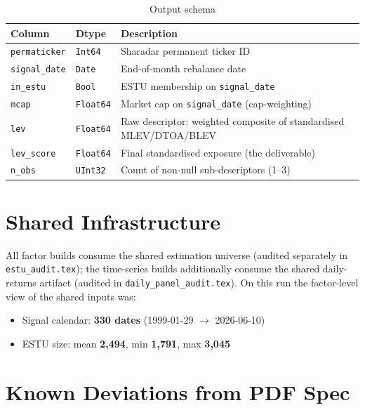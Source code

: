 \documentclass[11pt,a4paper]{article}
\begin{document}
\begin{table}[h!]
\centering
\caption{Output schema}
\begin{tabular}{llp{7.4cm}}
\toprule
\textbf{Column} & \textbf{Dtype} & \textbf{Description} \\
\midrule
\texttt{permaticker} & \texttt{Int64} & Sharadar permanent ticker ID \\
\texttt{signal\_date} & \texttt{Date} & End-of-month rebalance date \\
\texttt{in\_estu} & \texttt{Bool} & ESTU membership on \texttt{signal\_date} \\
\texttt{mcap} & \texttt{Float64} & Market cap on \texttt{signal\_date} (cap-weighting) \\
\texttt{lev} & \texttt{Float64} & Raw descriptor: weighted composite of standardised MLEV/DTOA/BLEV \\
\texttt{lev\_score} & \texttt{Float64} & Final standardised exposure (the deliverable) \\
\texttt{n\_obs} & \texttt{UInt32} & Count of non-null sub-descriptors (1--3) \\
\bottomrule
\end{tabular}
\end{table}

\section{Shared Infrastructure}

All factor builds consume the shared estimation universe
 (audited separately in
\texttt{estu\_audit.tex}); the time-series builds additionally consume the
shared daily-returns artifact (audited in \texttt{daily\_panel\_audit.tex}).
On this run the factor-level view of the shared inputs was:

\begin{itemize}[leftmargin=*,topsep=2pt,itemsep=2pt]
  \item Signal calendar: \textbf{330 dates} (1999-01-29 $\to$ 2026-06-10)
  \item ESTU size: mean \textbf{2{,}494}, min \textbf{1{,}791}, max \textbf{3{,}045}
\end{itemize}

\section{Known Deviations from PDF Spec}
\end{document}
